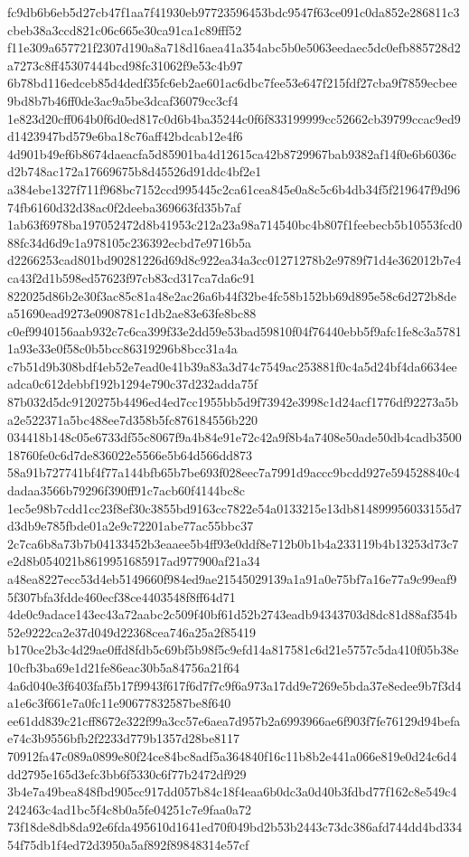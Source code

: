 \documentclass[11pt,a4paper]{article}
\begin{document}
{fc9db6b6eb5d27cb47f1aa7f41930eb97723596453bdc9547f63ce091c0da852e286811c3cbeb38a3ccd821c06c665e30ca91ca1c89fff52
f11e309a657721f2307d190a8a718d16aea41a354abc5b0e5063eedaec5dc0efb885728d2a7273c8ff45307444bcd98fc31062f9e53c4b97
6b78bd116edceb85d4dedf35fc6eb2ae601ac6dbc7fee53e647f215fdf27cba9f7859ecbee9bd8b7b46ff0de3ac9a5be3dcaf36079cc3cf4
1e823d20cff064b0f6d0ed817c0d6b4ba35244c0f6f833199999cc52662cb39799ccac9ed9d1423947bd579e6ba18c76aff42bdcab12e4f6
4d901b49ef6b8674daeacfa5d85901ba4d12615ca42b8729967bab9382af14f0e6b6036cd2b748ac172a17669675b8d45526d91ddc4bf2e1
a384ebe1327f711f968bc7152ccd995445c2ca61cea845e0a8c5c6b4db34f5f219647f9d9674fb6160d32d38ac0f2deeba369663fd35b7af
1ab63f6978ba197052472d8b41953c212a23a98a714540bc4b807f1feebecb5b10553fcd088fc34d6d9c1a978105c236392ecbd7e9716b5a
d2266253cad801bd90281226d69d8c922ea34a3cc01271278b2e9789f71d4e362012b7e4ca43f2d1b598ed57623f97cb83cd317ca7da6c91
822025d86b2e30f3ac85c81a48e2ac26a6b44f32be4fc58b152bb69d895e58c6d272b8dea51690ead9273e0908781c1db2ae83e63fe8bc88
c0ef9940156aab932c7c6ca399f33e2dd59e53bad59810f04f76440ebb5f9afc1fe8c3a57811a93e33e0f58c0b5bcc86319296b8bcc31a4a
c7b51d9b308bdf4eb52e7ead0e41b39a83a3d74c7549ac253881f0c4a5d24bf4da6634eeadca0c612debbf192b1294e790c37d232adda75f
87b032d5dc9120275b4496ed4ed7cc1955bb5d9f73942e3998c1d24acf1776df92273a5ba2e522371a5bc488ee7d358b5fc876184556b220
034418b148c05e6733df55c8067f9a4b84e91e72c42a9f8b4a7408e50ade50db4cadb350018760fe0c6d7de836022e5566e5b64d566dd873
58a91b727741bf4f77a144bfb65b7be693f028eec7a7991d9accc9bcdd927e594528840c4dadaa3566b79296f390ff91c7acb60f4144bc8c
1ec5e98b7cdd1cc23f8ef30c3855bd9163cc7822e54a0133215e13db814899956033155d7d3db9e785fbde01a2e9c72201abe77ac55bbc37
2c7ca6b8a73b7b04133452b3eaaee5b4ff93e0ddf8e712b0b1b4a233119b4b13253d73c7e2d8b054021b8619951685917ad977900af21a34
a48ea8227ecc53d4eb5149660f984ed9ae21545029139a1a91a0e75bf7a16e77a9c99eaf95f307bfa3fdde460ecf38ce4403548f8ff64d71
4de0c9adace143ec43a72aabc2c509f40bf61d52b2743eadb94343703d8dc81d88af354b52e9222ca2e37d049d22368cea746a25a2f85419
b170ce2b3c4d29ae0ffd8fdb5c69bf5b98f5c9efd14a817581c6d21e5757c5da410f05b38e10cfb3ba69e1d21fe86eac30b5a84756a21f64
4a6d040e3f6403faf5b17f9943f617f6d7f7c9f6a973a17dd9e7269e5bda37e8edee9b7f3d4a1e6c3f661e7a0fc11e90677832587be8f640
ee61dd839c21cff8672e322f99a3cc57e6aea7d957b2a6993966ae6f903f7fe76129d94befae74c3b9556bfb2f2233d779b1357d28be8117
70912fa47c089a0899e80f24ce84bc8adf5a364840f16c11b8b2e441a066e819e0d24c6d4dd2795e165d3efc3bb6f5330c6f77b2472df929
3b4e7a49bea848fbd905cc917dd057b84c18f4eaa6b0dc3a0d40b3fdbd77f162c8e549c4242463c4ad1bc5f4c8b0a5fe04251c7e9faa0a72
73f18de8db8da92e6fda495610d1641ed70f049bd2b53b2443c73dc386afd744dd4bd33454f75db1f4ed72d3950a5af892f89848314e57cf
}
\end{document}
